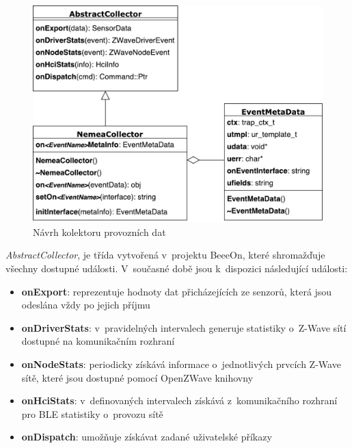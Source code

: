  \begin{figure}[ht]
   \begin{center}
   \includegraphics[scale=0.5]{pictures/modelTrid}
   \caption{Návrh kolektoru provozních dat}
   \label{obr.modelTrid}
   \end{center}
   \end{figure}
 
 \textit{AbstractCollector}, je třída vytvořená v~projektu BeeeOn, které shromažďuje všechny dostupné události.
 V~současné době jsou k~dispozici následující události:
 \begin{itemize}
  \item \textbf{onExport}:
   reprezentuje hodnoty dat přicházejících ze senzorů, která jsou odeslána vždy po jejich příjmu
   
  \item \textbf{onDriverStats}:
   v~pravidelných intervalech generuje statistiky o~Z-Wave sítí dostupné na komunikačním 
   rozhraní
   
  \item \textbf{onNodeStats}:
   periodicky získává informace o~jednotlivých prvcích Z-Wave sítě, které jsou dostupné pomocí
   OpenZWave knihovny
   
  \item \textbf{onHciStats}:
   v~definovaných intervalech získává z~komunikačního rozhraní pro BLE statistiky o~provozu
   sítě
  
  \item \textbf{onDispatch}:
  umožňuje získávat zadané uživatelské příkazy
 \end{itemize}

